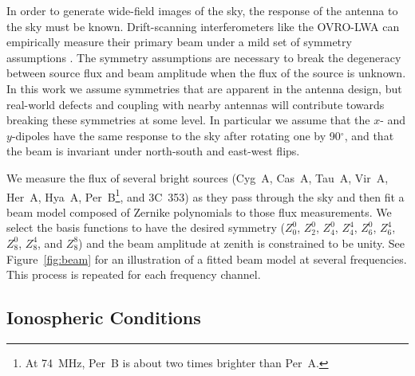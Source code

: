 \documentclass[twocolumn]{aastex61}
\begin{document}
In order to generate wide-field images of the sky, the response of the antenna to the sky must be
known. Drift-scanning interferometers like the OVRO-LWA can empirically measure their primary beam
under a mild set of symmetry assumptions \citep{2012AJ....143...53P}. The symmetry assumptions are
necessary to break the degeneracy between source flux and beam amplitude when the flux of the source
is unknown. In this work we assume symmetries that are apparent in the antenna design, but
real-world defects and coupling with nearby antennas will contribute towards breaking these
symmetries at some level. In particular we assume that the $x$- and $y$-dipoles have the same
response to the sky after rotating one by 90$^\circ$, and that the beam is invariant under
north-south and east-west flips.

We measure the flux of several bright sources (Cyg~A, Cas~A, Tau~A, Vir~A, Her~A, Hya~A,
Per~B\footnote{
    At 74~MHz, Per~B is about two times brighter than Per~A.
}, and
3C~353) as they pass through the sky and then fit a beam model composed of Zernike polynomials to
those flux measurements. We select the basis functions to have the desired symmetry ($Z_0^0$,
$Z_2^0$, $Z_4^0$, $Z_4^4$, $Z_6^0$, $Z_6^4$, $Z_8^0$, $Z_8^4$, and $Z_8^8$) and the beam amplitude
at zenith is constrained to be unity. See Figure~\ref{fig:beam} for an illustration of a fitted beam
model at several frequencies. This process is repeated for each frequency channel.

\subsection{Ionospheric Conditions}
\end{document}

